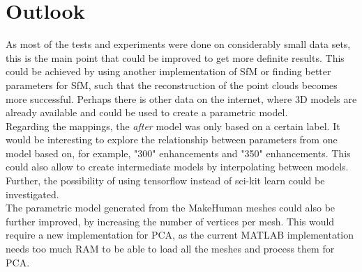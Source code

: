 \section{Outlook}
As most of the tests and experiments were done on considerably small data sets, this is the main point that could be improved to get more definite results. This could be achieved by using another implementation of SfM or finding better parameters for SfM, such that the reconstruction of the point clouds becomes more successful. Perhaps there is other data on the internet, where 3D models are already available and could be used to create a parametric model. \\
Regarding the mappings, the \textit{after} model was only based on a certain label. It would be interesting to explore the relationship between parameters from one model based on, for example, "300" enhancements and "350" enhancements. This could also allow to create intermediate models by interpolating between models. Further, the possibility of using tensorflow instead of sci-kit learn could be investigated.\\
The parametric model generated from the MakeHuman meshes could also be further improved, by increasing the number of vertices per mesh. This would require a new implementation for PCA, as the current MATLAB implementation needs too much RAM to be able to load all the meshes and process them for PCA.\\
